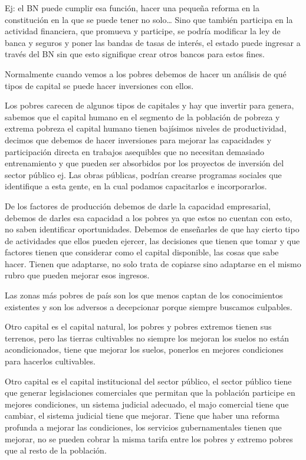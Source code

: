 \documentclass[
  a4paper,
]{article}
\begin{document}
Ej: el BN puede cumplir esa función, hacer una pequeña reforma en la
constitución en la que se puede tener no solo\ldots{} Sino que también
participa en la actividad financiera, que promueva y participe, se
podría modificar la ley de banca y seguros y poner las bandas de tasas
de interés, el estado puede ingresar a través del BN sin que esto
signifique crear otros bancos para estos fines.

Normalmente cuando vemos a los pobres debemos de hacer un análisis de
qué tipos de capital se puede hacer inversiones con ellos.

Los pobres carecen de algunos tipos de capitales y hay que invertir para
genera, sabemos que el capital humano en el segmento de la población de
pobreza y extrema pobreza el capital humano tienen bajísimos niveles de
productividad, decimos que debemos de hacer inversiones para mejorar las
capacidades y participación directa en trabajos asequibles que no
necesitan demasiado entrenamiento y que pueden ser absorbidos por los
proyectos de inversión del sector público ej. Las obras públicas,
podrían crearse programas sociales que identifique a esta gente, en la
cual podamos capacitarlos e incorporarlos.

De los factores de producción debemos de darle la capacidad empresarial,
debemos de darles esa capacidad a los pobres ya que estos no cuentan con
esto, no saben identificar oportunidades. Debemos de enseñarles de que
hay cierto tipo de actividades que ellos pueden ejercer, las decisiones
que tienen que tomar y que factores tienen que considerar como el
capital disponible, las cosas que sabe hacer. Tienen que adaptarse, no
solo trata de copiarse sino adaptarse en el mismo rubro que pueden
mejorar esos ingresos.

Las zonas más pobres de país son los que menos captan de los
conocimientos existentes y son los adversos a decepcionar porque siempre
buscamos culpables.

Otro capital es el capital natural, los pobres y pobres extremos tienen
sus terrenos, pero las tierras cultivables no siempre los mejoran los
suelos no están acondicionados, tiene que mejorar los suelos, ponerlos
en mejores condiciones para hacerlos cultivables.

Otro capital es el capital institucional del sector público, el sector
público tiene que generar legislaciones comerciales que permitan que la
población participe en mejores condiciones, un sistema judicial
adecuado, el majo comercial tiene que cambiar, el sistema judicial tiene
que mejorar. Tiene que haber una reforma profunda a mejorar las
condiciones, los servicios gubernamentales tienen que mejorar, no se
pueden cobrar la misma tarifa entre los pobres y extremo pobres que al
resto de la población.
\end{document}
